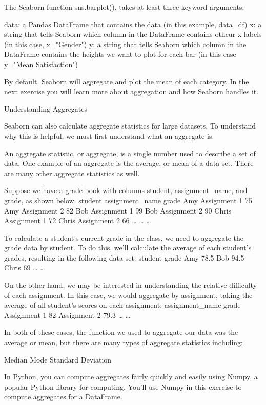 \documentclass{journal}
\begin{document}
The Seaborn function sns.barplot(), takes at least three keyword arguments:

    data: a Pandas DataFrame that contains the data (in this example, data=df)
    x: a string that tells Seaborn which column in the DataFrame contains otheur x-labels (in this case, x="Gender")
    y: a string that tells Seaborn which column in the DataFrame contains the heights we want to plot for each bar (in this case y="Mean Satisfaction")

By default, Seaborn will aggregate and plot the mean of each category. In the next exercise you will learn more about aggregation and how Seaborn handles it.

Understanding Aggregates

Seaborn can also calculate aggregate statistics for large datasets. To understand why this is helpful, we must first understand what an aggregate is.

An aggregate statistic, or aggregate, is a single number used to describe a set of data. One example of an aggregate is the average, or mean of a data set. There are many other aggregate statistics as well.

Suppose we have a grade book with columns student, assignment_name, and grade, as shown below.
student 	assignment_name 	grade
Amy 	Assignment 1 	75
Amy 	Assignment 2 	82
Bob 	Assignment 1 	99
Bob 	Assignment 2 	90
Chris 	Assignment 1 	72
Chris 	Assignment 2 	66
… 	… 	…

To calculate a student’s current grade in the class, we need to aggregate the grade data by student. To do this, we’ll calculate the average of each student’s grades, resulting in the following data set:
student 	grade
Amy 	78.5
Bob 	94.5
Chris 	69
… 	…

On the other hand, we may be interested in understanding the relative difficulty of each assignment. In this case, we would aggregate by assignment, taking the average of all student’s scores on each assignment:
assignment_name 	grade
Assignment 1 	82
Assignment 2 	79.3
… 	…

In both of these cases, the function we used to aggregate our data was the average or mean, but there are many types of aggregate statistics including:

    Median
    Mode
    Standard Deviation

In Python, you can compute aggregates fairly quickly and easily using Numpy, a popular Python library for computing. You’ll use Numpy in this exercise to compute aggregates for a DataFrame.
\end{document}

